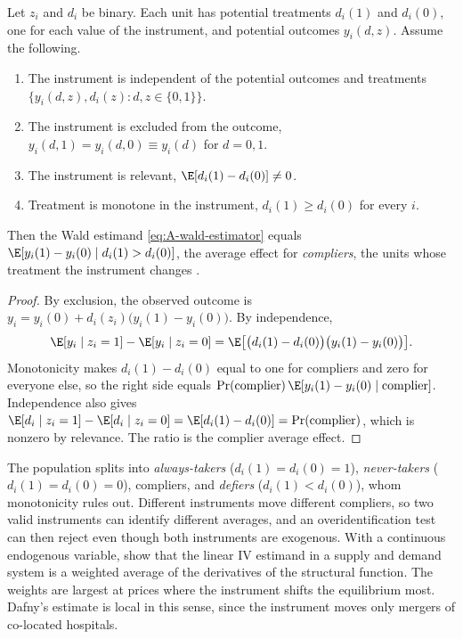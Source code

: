\begin{theorem}\label{thm:A-late}
Let $z_i$ and $d_i$ be binary. Each unit has potential treatments $d_i(1)$ and $d_i(0)$, one for each value of
the instrument, and potential outcomes $y_i(d, z)$. Assume the following.
\begin{enumerate}[label=(\roman*)]
\item The instrument is independent of the potential outcomes and treatments
  $\{y_i(d, z), d_i(z) : d, z \in \{0, 1\}\}$.
\item The instrument is excluded from the outcome, $y_i(d, 1) = y_i(d, 0) \equiv y_i(d)$ for $d = 0, 1$.
\item The instrument is relevant, $\E[d_i(1) - d_i(0)] \neq 0$.
\item Treatment is monotone in the instrument, $d_i(1) \ge d_i(0)$ for every $i$.
\end{enumerate}
Then the Wald estimand \eqref{eq:A-wald-estimator} equals
$\E[y_i(1) - y_i(0) \mid d_i(1) > d_i(0)]$, the average effect for \emph{compliers}, the units whose treatment
the instrument changes \citep{ImbensAngrist1994}.
\end{theorem}

\begin{proof}
By exclusion, the observed outcome is $y_i = y_i(0) + d_i(z_i)\bigl(y_i(1) - y_i(0)\bigr)$. By independence,
\begin{equation*}
\E[y_i \mid z_i = 1] - \E[y_i \mid z_i = 0] = \E\bigl[\bigl(d_i(1) - d_i(0)\bigr)\bigl(y_i(1) - y_i(0)\bigr)\bigr] .
\end{equation*}
Monotonicity makes $d_i(1) - d_i(0)$ equal to one for compliers and zero for everyone else, so the right side
equals $\Pr(\text{complier})\,\E[y_i(1) - y_i(0) \mid \text{complier}]$. Independence also gives
$\E[d_i \mid z_i = 1] - \E[d_i \mid z_i = 0] = \E[d_i(1) - d_i(0)] = \Pr(\text{complier})$, which is nonzero by
relevance. The ratio is the complier average effect.
\end{proof}

The population splits into \emph{always-takers} ($d_i(1) = d_i(0) = 1$), \emph{never-takers}
($d_i(1) = d_i(0) = 0$), compliers, and \emph{defiers} ($d_i(1) < d_i(0)$), whom monotonicity rules out.
Different instruments move different compliers, so two valid instruments can identify different averages, and
an overidentification test can then reject even though both instruments are exogenous. With a continuous
endogenous variable, \citet{AngristGraddyImbens2000} show that the linear IV estimand in a supply and demand
system is a weighted average of the derivatives of the structural function. The weights are largest at
prices where the instrument shifts the equilibrium most. Dafny's estimate is local in this sense, since the
instrument moves only mergers of co-located hospitals.

